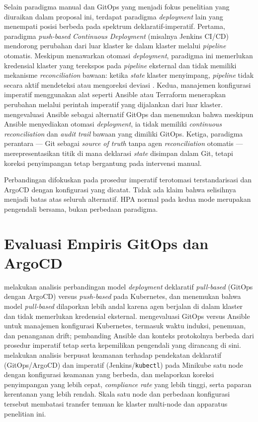 Selain paradigma manual dan GitOps yang menjadi fokus penelitian yang diuraikan dalam proposal ini, terdapat paradigma \textit{deployment} lain yang menempati posisi berbeda pada spektrum deklaratif-imperatif. Pertama, paradigma \textit{push-based} \textit{Continuous Deployment} (misalnya Jenkins CI/CD) mendorong perubahan dari luar klaster ke dalam klaster melalui \textit{pipeline} otomatis. Meskipun menawarkan otomasi \textit{deployment}, paradigma ini memerlukan kredensial klaster yang terekspos pada \textit{pipeline} eksternal dan tidak memiliki mekanisme \textit{reconciliation} bawaan: ketika \textit{state} klaster menyimpang, \textit{pipeline} tidak secara aktif mendeteksi atau mengoreksi deviasi \citep{utami2021analysis}. Kedua, manajemen konfigurasi imperatif menggunakan alat seperti Ansible atau Terraform menerapkan perubahan melalui perintah imperatif yang dijalankan dari luar klaster. \citet{shrestha2024configuration} mengevaluasi Ansible sebagai alternatif GitOps dan menemukan bahwa meskipun Ansible menyediakan otomasi \textit{deployment}, ia tidak memiliki \textit{continuous reconciliation} dan \textit{audit trail} bawaan yang dimiliki GitOps. Ketiga, paradigma perantara --- Git sebagai \textit{source of truth} tanpa agen \textit{reconciliation} otomatis --- merepresentasikan titik di mana deklarasi \textit{state} disimpan dalam Git, tetapi koreksi penyimpangan tetap bergantung pada intervensi manual.

Perbandingan difokuskan pada prosedur imperatif terotomasi terstandarisasi dan ArgoCD dengan konfigurasi yang dicatat. Tidak ada klaim bahwa selisihnya menjadi batas atas seluruh alternatif. HPA normal pada kedua mode merupakan pengendali bersama, bukan perbedaan paradigma.

\section{Evaluasi Empiris GitOps dan ArgoCD}

\citet{utami2021analysis} melakukan analisis perbandingan model \textit{deployment} deklaratif \textit{pull-based} (GitOps dengan ArgoCD) versus \textit{push-based} pada Kubernetes, dan menemukan bahwa model \textit{pull-based} dilaporkan lebih andal karena agen berjalan di dalam klaster dan tidak memerlukan kredensial eksternal. \citet{shrestha2024configuration} mengevaluasi GitOps versus Ansible untuk manajemen konfigurasi Kubernetes, termasuk waktu induksi, penemuan, dan penanganan drift; pembanding Ansible dan konteks protokolnya berbeda dari prosedur imperatif tetap serta kepemilikan pengendali yang dirancang di sini. \citet{kaggantinataraja2025security} melakukan analisis berpusat keamanan terhadap pendekatan deklaratif (GitOps/ArgoCD) dan imperatif (Jenkins/\texttt{kubectl}) pada Minikube satu node dengan konfigurasi keamanan yang berbeda, dan melaporkan koreksi penyimpangan yang lebih cepat, \textit{compliance rate} yang lebih tinggi, serta paparan kerentanan yang lebih rendah. Skala satu node dan perbedaan konfigurasi tersebut membatasi transfer temuan ke klaster multi-node dan apparatus penelitian ini.

